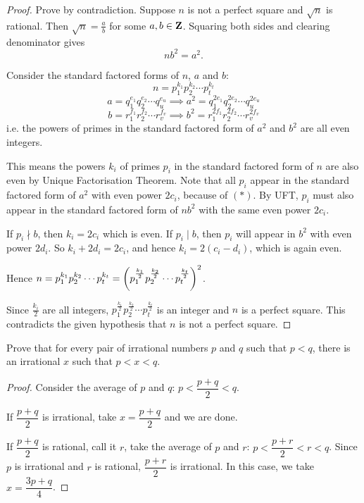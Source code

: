 \begin{proof}
Prove by contradiction. Suppose $n$ is not a perfect square and $\sqrt{n}$ is rational. Then $\sqrt{n}=\frac{a}{b}$ for some $a,b\in\mathbf Z$. Squaring both sides and clearing denominator gives 
\begin{equation*}\tag{$\ast$}
nb^2=a^2.
\end{equation*}

Consider the standard factored forms of $n$, $a$ and $b$:
\[ n=p_1^{k_1}p_2^{k_2}\cdots p_t^{k_t} \]
\[ a=q_1^{e_1}q_2^{e_2}\cdots q_u^{e_u} \implies a^2=q_1^{2e_1}q_2^{2e_2}\cdots q_u^{2e_u} \]
\[ b=r_1^{f_1}r_2^{f_2}\cdots r_v^{f_v} \implies b^2=r_1^{2f_1}r_2^{2f_2}\cdots r_v^{2f_v} \]
i.e. the powers of primes in the standard factored form of $a^2$ and $b^2$ are all even integers. 

This means the powers $k_i$ of primes $p_i$ in the standard factored form of $n$ are also even by Unique Factorisation Theorem. Note that all $p_i$ appear in the standard factored form of $a^2$ with even power $2c_i$, because of $(\ast)$. By UFT, $p_i$ must also appear in the standard factored form of $nb^2$ with the same even power $2c_i$.

If $p_i\nmid b$, then $k_i=2c_i$ which is even. If $p_i\mid b$, then $p_i$ will appear in $b^2$ with even power $2d_i$. So $k_i+2d_i=2c_i$, and hence $k_i=2(c_i-d_i)$, which is again even.

Hence $n=p_1^{k_1}p_2^{k_2}\cdots p_t^{k_t}=\left(p_1^{\frac{k_1}{2}}p_2^{\frac{k_2}{2}}\cdots p_t^{\frac{k_t}{2}}\right)^2$.

Since $\frac{k_i}{2}$ are all integers, $p_1^{\frac{k_1}{2}}p_2^{\frac{k_2}{2}}\cdots p_t^{\frac{k_t}{2}}$ is an integer and $n$ is a perfect square. This contradicts the given hypothesis that $n$ is not a perfect square.
\end{proof}

\begin{prbm}
Prove that for every pair of irrational numbers $p$ and $q$ such that $p<q$, there is an irrational $x$ such that $p<x<q$.
\end{prbm}

\begin{proof}
Consider the average of $p$ and $q$: $p<\dfrac{p+q}{2}<q$.

If $\dfrac{p+q}{2}$ is irrational, take $x=\dfrac{p+q}{2}$ and we are done.

If $\dfrac{p+q}{2}$ is rational, call it $r$, take the average of $p$ and $r$: $p<\dfrac{p+r}{2}<r<q$. Since $p$ is irrational and $r$ is rational, $\dfrac{p+r}{2}$ is irrational. In this case, we take $x=\dfrac{3p+q}{4}$.
\end{proof}

